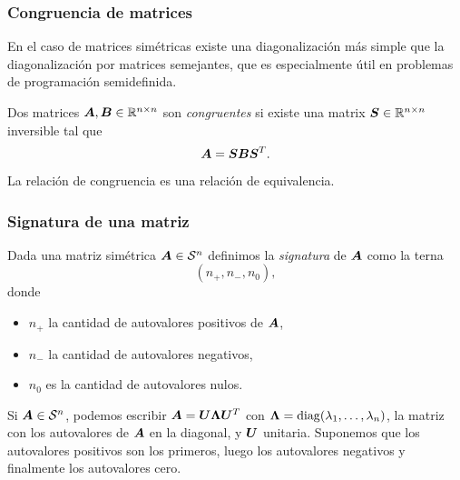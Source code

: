 \documentclass[aspectratio=169,12pt,spanish]{beamer}
\begin{document}
\begin{frame}
\frametitle{Congruencia de matrices}

En el caso de matrices simétricas existe una diagonalización más simple que la diagonalización por matrices semejantes, que es especialmente útil en problemas de programación semidefinida.

\begin{definition}
Dos matrices $\bm{A}, \bm{B} \in \mathbb{R}^{n\times n}$ son \emph{congruentes} si existe una matrix $\bm{S} \in \mathbb{R}^{n\times n}$ inversible tal que
$$
\bm{A} = \bm{S} \bm{B} \bm{S}^T.
$$
\end{definition}

La relación de congruencia es una relación de equivalencia.

\end{frame}


\begin{frame}
\frametitle{Signatura de una matriz}

Dada una matriz simétrica $\bm{A} \in {\mathcal S^n}$ definimos la \emph{signatura} de $\bm{A}$ como la terna
$$(n_+, n_-, n_0),$$
donde
\begin{itemize}
\item $n_+$ la cantidad de autovalores positivos de $\bm{A}$,
\item $n_-$ la cantidad de autovalores negativos,
\item $n_0$ es la cantidad de autovalores nulos.
\end{itemize}

Si $\bm{A} \in {\mathcal S^n}$, podemos escribir $\bm{A} = \bm{U} \bm{\Lambda} \bm{U}^T$ con $\bm{\Lambda} =  \operatorname{diag}(\lambda_1, \dots, \lambda_n)$, la matriz con los autovalores de $\bm{A}$ en la diagonal, y $\bm{U}$ unitaria. Suponemos que los autovalores positivos son los primeros, luego los autovalores negativos y finalmente los autovalores cero.


\end{frame}

\end{document}
